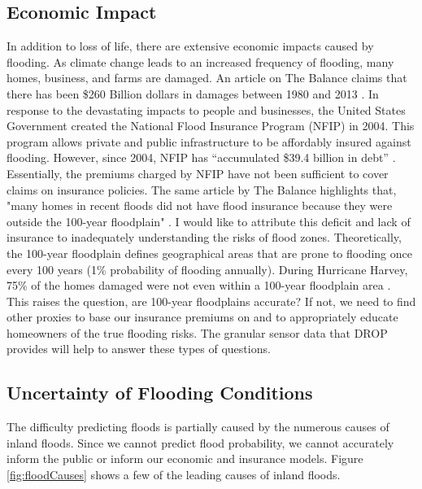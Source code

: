 \documentclass[letter]{article}
\begin{document}
\subsection{Economic Impact}
In addition to loss of life, there are extensive economic impacts caused by flooding. As climate change leads to an increased frequency of flooding, many homes, business, and farms are damaged. An article on The Balance claims that there has been \$260 Billion dollars in damages between 1980 and 2013 \cite{economicImpact}. In response to the devastating impacts to people and businesses, the United States Government created the National Flood Insurance Program (NFIP) in 2004. This program allows private and public infrastructure to be affordably insured against flooding. However, since 2004, NFIP has ``accumulated \$39.4 billion in debt'' \cite{economicImpact}. Essentially, the premiums charged by NFIP have not been sufficient to cover claims on insurance policies. The same article by The Balance highlights that, "many homes in recent floods did not have flood insurance because they were outside the 100-year floodplain" \cite{economicImpact}. I would like to attribute this deficit and lack of insurance to inadequately understanding the risks of flood zones. Theoretically, the 100-year floodplain defines geographical areas that are prone to flooding once every 100 years (1\% probability of flooding annually). During Hurricane Harvey, 75\% of the homes damaged were not even within a 100-year floodplain area \cite{economicImpact}. This raises the question, are 100-year floodplains accurate? If not, we need to find other proxies to base our insurance premiums on and to appropriately educate homeowners of the true flooding risks. The granular sensor data that DROP provides will help to answer these types of questions. 

\subsection{Uncertainty of Flooding Conditions}

The difficulty predicting floods is partially caused by the numerous causes of inland floods. Since we cannot predict flood probability, we cannot accurately inform the public or inform our economic and insurance models. Figure \ref{fig:floodCauses} shows a few of the leading causes of inland floods. 
\end{document}
